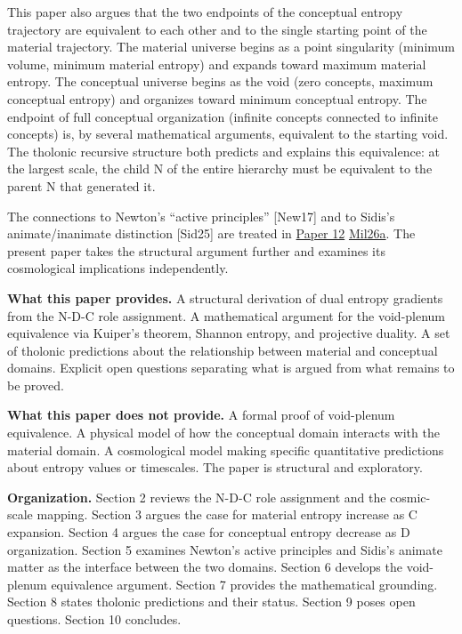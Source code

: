 \documentclass[
  11pt,
  letterpaper,
]{article}
\begin{document}
This paper also argues that the two endpoints of the conceptual entropy
trajectory are equivalent to each other and to the single starting point
of the material trajectory. The material universe begins as a point
singularity (minimum volume, minimum material entropy) and expands
toward maximum material entropy. The conceptual universe begins as the
void (zero concepts, maximum conceptual entropy) and organizes toward
minimum conceptual entropy. The endpoint of full conceptual organization
(infinite concepts connected to infinite concepts) is, by several
mathematical arguments, equivalent to the starting void. The tholonic
recursive structure both predicts and explains this equivalence: at the
largest scale, the child N of the entire hierarchy must be equivalent to
the parent N that generated it.

The connections to Newton's ``active principles'' {[}New17{]} and to
Sidis's animate/inanimate distinction {[}Sid25{]} are treated in
\href{https://github.com/baardev/truevalue/blob/main/docnav/Research/papers/12_newton-tholonic-framework/12_newton-tholonic-framework.pdf}{Paper
12}
\href{https://github.com/baardev/truevalue/blob/main/docnav/Research/papers/12_newton-tholonic-framework/12_newton-tholonic-framework.pdf}{Mil26a}.
The present paper takes the structural argument further and examines its
cosmological implications independently.

\textbf{What this paper provides.} A structural derivation of dual
entropy gradients from the N-D-C role assignment. A mathematical
argument for the void-plenum equivalence via Kuiper's theorem, Shannon
entropy, and projective duality. A set of tholonic predictions about the
relationship between material and conceptual domains. Explicit open
questions separating what is argued from what remains to be proved.

\textbf{What this paper does not provide.} A formal proof of void-plenum
equivalence. A physical model of how the conceptual domain interacts
with the material domain. A cosmological model making specific
quantitative predictions about entropy values or timescales. The paper
is structural and exploratory.

\textbf{Organization.} Section 2 reviews the N-D-C role assignment and
the cosmic-scale mapping. Section 3 argues the case for material entropy
increase as C expansion. Section 4 argues the case for conceptual
entropy decrease as D organization. Section 5 examines Newton's active
principles and Sidis's animate matter as the interface between the two
domains. Section 6 develops the void-plenum equivalence argument.
Section 7 provides the mathematical grounding. Section 8 states tholonic
predictions and their status. Section 9 poses open questions. Section 10
concludes.
\end{document}
